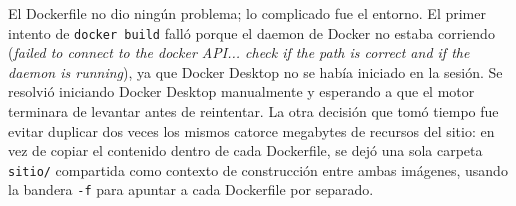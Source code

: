 \documentclass[10pt,a4paper]{article}
\begin{document}
El Dockerfile no dio ningún problema; lo complicado fue el entorno. El primer intento de \texttt{docker build} falló porque el daemon de Docker no estaba corriendo (\textit{failed to connect to the docker API... check if the path is correct and if the daemon is running}), ya que Docker Desktop no se había iniciado en la sesión. Se resolvió iniciando Docker Desktop manualmente y esperando a que el motor terminara de levantar antes de reintentar. La otra decisión que tomó tiempo fue evitar duplicar dos veces los mismos catorce megabytes de recursos del sitio: en vez de copiar el contenido dentro de cada Dockerfile, se dejó una sola carpeta \texttt{sitio/} compartida como contexto de construcción entre ambas imágenes, usando la bandera \texttt{-f} para apuntar a cada Dockerfile por separado.

\pagebreak

\section{\color{colorIPN}{Referencias Bibliográficas}}
\color{colorESCOM}{
	\printbibliography[heading=none]
}
\end{document}

